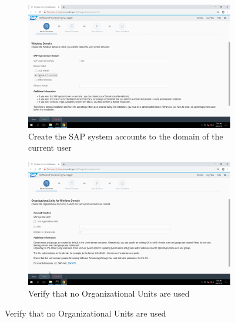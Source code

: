 \begin{figure}[!htb]\ContinuedFloat
    \begin{subfigure}{0.5\textwidth}
        \captionsetup{width=0.8\linewidth}
        \includegraphics[width=0.9\linewidth]{img/Methodologie/SAP30.png}
        \centering
        \caption{Create the SAP system accounts to the domain of the current user}
    \end{subfigure}
    \begin{subfigure}{0.5\textwidth}
        \captionsetup{width=0.8\linewidth}
        \includegraphics[width=0.9\linewidth]{img/Methodologie/SAP29.png} 
        \centering
        \caption{Verify that no Organizational Units are used}
    \end{subfigure}
\end{figure}
